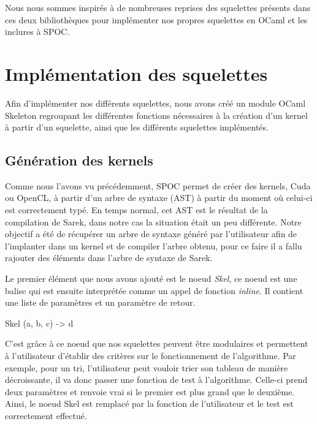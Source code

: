 \documentclass{report}
\begin{document}
Nous nous sommes inspirés à de nombreuses reprises des squelettes présents dans ces deux bibliothèques pour implémenter nos propres squelettes en OCaml et les inclures à SPOC. 

\section{Implémentation des squelettes}
Afin d'implémenter nos différents squelettes, nous avons créé un module OCaml Skeleton regroupant les différentes fonctions nécessaires à la création d'un kernel à partir d'un squelette, ainsi que les différents squelettes implémentés. 

\subsection{Génération des kernels}
Comme nous l'avons vu précédemment, SPOC permet de créer des kernels, Cuda ou OpenCL, à partir d'un arbre de syntaxe (AST) à partir du moment où celui-ci est correctement typé. En temps normal, cet AST est le résultat de la compilation de Sarek, dans notre cas la situation était un peu différente. Notre objectif a été de récupérer un arbre de syntaxe généré par l'utilisateur afin de l'implanter dans un kernel et de compiler l'arbre obtenu, pour ce faire il a fallu rajouter des éléments dans l'arbre de syntaxe de Sarek.\newline

Le premier élément que nous avons ajouté est le noeud \textit{Skel}, ce noeud est une balise qui est ensuite interprétée comme un appel de fonction \textit{inline}. Il contient une liste de paramètres et un paramètre de retour. \newline

\begin{verbatimtab}
Skel (a, b, c) -> d
\end{verbatimtab}

C'est grâce à ce noeud que nos squelettes peuvent être modulaires et permettent à l'utilisateur d'établir des critères sur le fonctionnement de l'algorithme. Par exemple, pour un tri, l'utilisateur peut vouloir trier son tableau de manière décroissante, il va donc passer une fonction de test à l'algorithme. Celle-ci prend deux paramètres et renvoie vrai si le premier est plus grand que le deuxième. Ainsi, le noeud Skel est remplacé par la fonction de l'utilisateur et le test est correctement effectué. 
\end{document}
